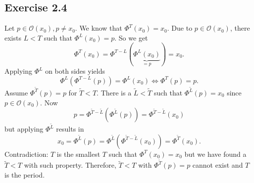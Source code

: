 \documentclass{article}
\theoremstyle{named}
\begin{document}
\begin{enumerate}[label=(\roman*)]
 \subsection*{Exercise 2.4}
 Let $p \in \mathcal O(x_0), p \neq x_0$. We know that $\Phi^T(x_0) = x_0$. Due to $p \in \mathcal O(x_0)$, there exists $L < T$ such that $\Phi^L(x_0) = p$. So we get
 \[
 	\Phi^T(x_0) = \Phi^{T-L}(\underbrace{\Phi^L(x_0)}_{= p}) = x_0.
 \]
 Applying $\Phi^L$ on both sides yields
 \[
 	\Phi^L(\Phi^{T-L}(p)) = \Phi^L(x_0) \iff \Phi^T(p) = p.
 \]
 Assume $\Phi^{\tilde T}(p) = p$ for $\tilde T < T$. There is a $\tilde L < \tilde T$ such that $\Phi^{\tilde L}(p) = x_0$ since $p \in \mathcal O(x_0)$. Now
 \[
 	p = \Phi^{\tilde T-\tilde L}(\Phi^{\tilde L}(p)) = \Phi^{\tilde T- \tilde L}(x_0)
 \]
 but applying $\Phi^{\tilde{L}}$ results in
 \[
 	x_0 = \Phi^{\tilde L} (p) = \Phi^{\tilde L}(\Phi^{\tilde T - \tilde L}(x_0)) = \Phi^{\tilde T}(x_0).
 \]
 Contradiction: $T$ is the smallest $T$ such that $\Phi^{T}(x_0) = x_0$ but we have found a $\tilde T< T$ with such property. Therefore, $\tilde T< T$ with $\Phi^{\tilde T}(p) = p$ cannot exist and $T$ is the period.
\end{enumerate}
\end{document}
